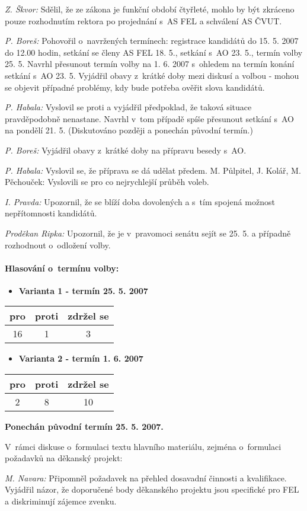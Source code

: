 \documentclass[a4paper,12pt,notitlepage,oneside]{article}
\newcommand{\hlasovani}[3]{\begin{center}
\begin{tabular}{|c|c|c|}\hline
pro& proti & zdržel se \\ \hline
#1 & #2 & #3 \\ \hline
\end{tabular}
\end{center}}
\begin{document}
\textit{Z. Škvor:} Sdělil, že ze zákona je funkční období čtyřleté, mohlo by být zkráceno pouze  rozhodnutím rektora po projednání s~AS FEL a schválení AS ČVUT.

\textit{P. Boreš:} Pohovořil o~navržených termínech: registrace kandidátů do 15. 5. 2007 do 12.00 hodin, setkání se členy AS FEL 18. 5., setkání s~AO 23. 5., termín volby 25. 5. Navrhl přesunout termín volby na 1. 6. 2007 s~ohledem na termín konání setkání s~AO 23. 5. Vyjádřil obavy z~krátké doby mezi diskusí a volbou - mohou se objevit případné problémy, kdy bude potřeba ověřit slova kandidátů.

\textit{P. Habala:} Vyslovil se proti a vyjádřil předpoklad, že taková situace pravděpodobně nenastane. Navrhl v~tom případě spíše přesunout setkání s~AO na pondělí 21. 5. (Diskutováno později a ponechán původní termín.)

\textit{P. Boreš:} Vyjádřil obavy z~krátké doby na přípravu besedy s~AO.

\textit{P. Habala:} Vyslovil se, že příprava se dá udělat předem.
M. Půlpitel, J. Kolář, M. Pěchouček: Vyslovili se pro co nejrychlejší průběh voleb.

\textit{I. Pravda:} Upozornil, že se blíží doba dovolených a s~tím spojená možnost nepřítomnosti kandidátů.

\textit{Proděkan Ripka:} Upozornil, že je v~pravomoci senátu sejít se 25. 5. a případně rozhodnout o~odložení volby.

\newpage
\paragraph{Hlasování o~termínu volby:}
\begin{itemize}
\item \textbf{Varianta 1 - termín 25. 5. 2007}
\end{itemize}
\hlasovani{16}{1}{3}
\begin{itemize}
\item 
\textbf{Varianta 2 - termín 1. 6. 2007}
\end{itemize}
\hlasovani{2}{8}{10}
\textbf{Ponechán původní termín 25. 5. 2007.}

V~rámci diskuse o~formulaci textu hlavního materiálu, zejména o~formulaci požadavků na děkanský projekt:

\textit{M. Navara:} Připomněl požadavek na přehled dosavadní činnosti a kvalifikace. Vyjádřil názor, že doporučené body děkanského projektu jsou specifické pro FEL a diskriminují zájemce zvenku.
\end{document}
